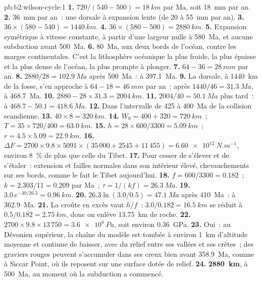 \begin{solution}{pb:b2:wilson-cycle:1}
\textbf{1.} $720/(540 - 500) = \qty{18}{km}$ par Ma, soit \qty{18}{mm} par an.
\textbf{2.} \qty{36}{mm} par an~: une dorsale à expansion lente (de 20 à \qty{55}{mm} par an).
\textbf{3.} $36\times(580 - 540) = \qty{1440}{km}$.
\textbf{4.} $36\times(580 - 500) = \qty{2880}{km}$.
\textbf{5.} Expansion symétrique à vitesse constante, à partir d'une largeur nulle à \qty{580}{Ma}, et aucune
subduction avant \qty{500}{Ma}.
\textbf{6.} \qty{80}{Ma}, aux deux bords de l'océan, contre les marges continentales. C'est la
lithosphère océanique la plus froide, la plus épaisse et la plus dense de l'océan, la plus prompte à plonger.
\textbf{7.} $64 - 36 = \qty{28}{mm}$ par an.
\textbf{8.} $2880/28 = \qty{102.9}{Ma}$ après \qty{500}{Ma}~: à \qty{397.1}{Ma}.
\textbf{9.} La dorsale, à \qty{1440}{km} de la fosse, s'en approche à $64 - 18 =
\qty{46}{mm}$ par an~: après $1440/46 = \qty{31.3}{Ma}$, à \qty{468.7}{Ma}.
\textbf{10.} $2880 - 28\times31.3 = \qty{2004}{km}$.
\textbf{11.} $2004/40 = \qty{50.1}{Ma}$ plus tard~: à $468.7 - 50.1 = \qty{418.6}{Ma}$.
\textbf{12.} Dans l'intervalle de 425 à \qty{400}{Ma} de la collision scandienne.
\textbf{13.} $40\times8 = \qty{320}{km}$.
\textbf{14.} $W_0 = 400 + 320 = \qty{720}{km}$~; $T = 35\times720/400 = \qty{63.0}{km}$.
\textbf{15.} $h = 28\times600/3300 = \qty{5.09}{km}$~; $r = 4.5\times5.09 = \qty{22.9}{km}$.
\textbf{16.} $\Delta F = 2700\times9.8\times5091\times(35\,000 + 2545 + 11\,455) =
\qty{6.60e12}{N.m^{-1}}$, environ \qty{8}{\percent} de plus que celle du Tibet.
\textbf{17.} Pour cesser de s'élever et de s'étaler~: extension et failles normales dans son intérieur élevé,
chevauchements sur ses bords, comme le fait le Tibet aujourd'hui.
\textbf{18.} $f = 600/3300 = 0.182$~; $k = 2.303/11 = 0.209$ par Ma~; $\tau = 1/(kf)
= \qty{26.3}{Ma}$.
\textbf{19.} $3.0\,e^{-30/26.3} = \qty{0.96}{km}$.
\textbf{20.} $26.3\ln(3.0/0.5) = \qty{47.1}{Ma}$ après \qty{410}{Ma}~: à \qty{362.9}{Ma}.
\textbf{21.} La croûte en excès vaut $h/f$~: $3.0/0.182 = \qty{16.5}{km}$ se réduit à $0.5/0.182 =
\qty{2.75}{km}$, donc on enlève \qty{13.75}{km} de roche.
\textbf{22.} $2700\times9.8\times13\,750 = \qty{3.6e8}{Pa}$, soit environ \qty{0.36}{GPa}.
\textbf{23.} Oui~: au Dévonien supérieur, la chaîne du modèle est tombée à environ \qty{1}{km} d'altitude
moyenne et continue de baisser, avec du relief entre ses vallées et ses crêtes~; des graviers rouges peuvent
s'accumuler dans ses creux bien avant \qty{358.9}{Ma}, comme à Siccar Point, où ils reposent sur une surface
dotée de relief.
\textbf{24.} \textbf{\qty[text-series-to-math=true]{2880}{km}}, à \qty{500}{Ma}, au moment où
la subduction a commencé.
\end{solution}
